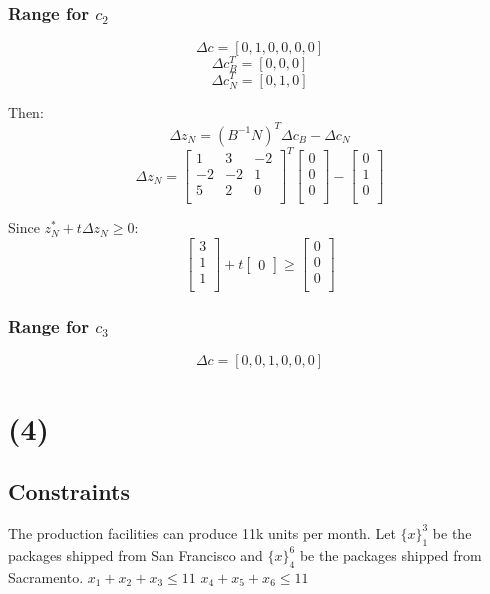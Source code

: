 \documentclass[14pt]{extarticle}
\begin{document}
\subsubsection*{Range for $c_2$}
\[
    \Delta c = [0, 1, 0, 0, 0, 0]
\]
\[
    \Delta c^T_B = [0, 0, 0]
\]
\[
    \Delta c^T_N = [0, 1, 0]
\]

\bigskip Then:
\[
    \Delta z_N = (B^{-1}N)^T \Delta c_B - \Delta c_N
\]
\[
    \Delta z_N = \begin{bmatrix}
        1 & 3 & -2 \\
        -2 & -2 & 1 \\
        5 & 2 & 0 \\
    \end{bmatrix}^T
    \begin{bmatrix}
        0 \\
        0 \\
        0 \\
    \end{bmatrix}
    - \begin{bmatrix}
        0 \\
        1 \\
        0 \\
    \end{bmatrix}
\]

\bigskip Since $z^*_N + t\Delta z_N \geq 0$:
\[
    \begin{bmatrix}
        3 \\
        1 \\
        1 \\
    \end{bmatrix}
    + t \begin{bmatrix}
        0
    \end{bmatrix}
    \geq \begin{bmatrix}
        0 \\
        0 \\
        0 \\
    \end{bmatrix}
\]

\subsubsection*{Range for $c_3$}
\[
    \Delta c = [0, 0, 1, 0, 0, 0]
\]

\section*{(4)}
\subsection*{Constraints}
The production facilities can produce 11k units per month. Let $\{x\}_1^3$ be the packages shipped from San Francisco and $\{x\}_4^6$ be the packages shipped from Sacramento.
\newline $x_1 + x_2 + x_3 \leq 11$
\newline $x_4 + x_5 + x_6 \leq 11$
\end{document}
